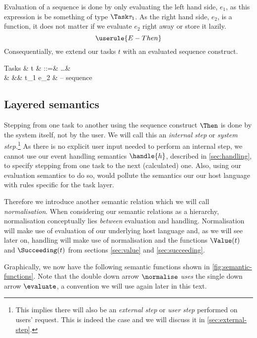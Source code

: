Evaluation of a sequence is done by only evaluating the left hand side, $e_1$,
as this expression is be something of type $\Task \tau_1$.
As the right hand side, $e_2$, is a function,
it does not matter if we evaluate $e_2$ right away or store it lazily.
\begin{equation*}
  \userule{E-Then}
\end{equation*}
Consequentially, we extend our tasks $t$ with an evaluated sequence construct.
\begin{grammar}
  Tasks
    & t & ::=& \ldots        & \\
    &   &\mid& t_1 \Then e_2 & – sequence \\
\end{grammar}


\subsection{Layered semantics}
\label{sec:normalise}
\label{sec:drive}

Stepping from one task to another using the sequence construct $\Then$ is done by the system itself,
not by the user.
We will call this an \emph{internal step} or \emph{system step}.\footnote{
  This implies there will also be an \emph{external step} or \emph{user step} performed on users' request.
  This is indeed the case and we will discuss it in \autoref{sec:external-step}.
}
As there is no explicit user input needed to perform an internal step,
we cannot use our event handling semantics $\handle{h}$,
described in \autoref{sec:handling},
to specify stepping from one task to the next (calculated) one.
Also,
using our evaluation semantics to do so,
would pollute the semantics our our host language with rules specific for the task layer.

Therefore we introduce another semantic relation which we will call \emph{normalisation}.
When considering our semantic relations as a hierarchy,
normalisation conceptually lies \emph{between} evaluation and handling.
Normalisation will make use of evaluation of our underlying host language and,
as we will see later on,
handling will make use of normalisation
and the functions $\Value(t)$ and $\Succeeding(t)$ from sections \autoref{sec:value} and \autoref{sec:succeeding}.

Graphically,
we now have the following semantic functions shown in \autoref{fig:semantic-functions}.
Note that the double down arrow $\normalise$ \emph{uses} the single down arrow $\evaluate$,
a convention we will use again later in this text.

